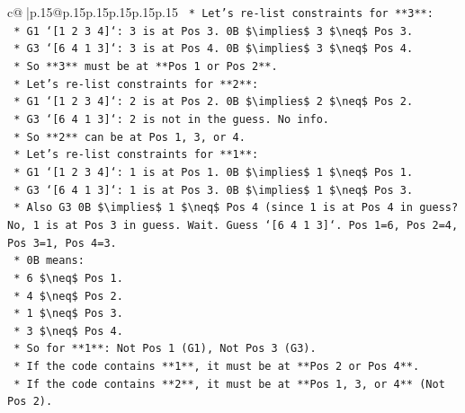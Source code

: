 \documentclass{article}
\begin{document}
{\begin{supertabular}{c@{$\;$}|p{.15\linewidth}@{}p{.15\linewidth}p{.15\linewidth}p{.15\linewidth}p{.15\linewidth}p{.15\linewidth}}
{{{\texttt{            *   Let's re{-}list constraints for **3**:} \\
\texttt{                *   G1 `{[}1 2 3 4{]}`: 3 is at Pos 3. 0B \$\textbackslash{}implies\$ 3 \$\textbackslash{}neq\$ Pos 3.} \\
\texttt{                *   G3 `{[}6 4 1 3{]}`: 3 is at Pos 4. 0B \$\textbackslash{}implies\$ 3 \$\textbackslash{}neq\$ Pos 4.} \\
\texttt{                *   So **3** must be at **Pos 1 or Pos 2**.} \\
\texttt{            *   Let's re{-}list constraints for **2**:} \\
\texttt{                *   G1 `{[}1 2 3 4{]}`: 2 is at Pos 2. 0B \$\textbackslash{}implies\$ 2 \$\textbackslash{}neq\$ Pos 2.} \\
\texttt{                *   G3 `{[}6 4 1 3{]}`: 2 is not in the guess. No info.} \\
\texttt{                *   So **2** can be at Pos 1, 3, or 4.} \\
\texttt{            *   Let's re{-}list constraints for **1**:} \\
\texttt{                *   G1 `{[}1 2 3 4{]}`: 1 is at Pos 1. 0B \$\textbackslash{}implies\$ 1 \$\textbackslash{}neq\$ Pos 1.} \\
\texttt{                *   G3 `{[}6 4 1 3{]}`: 1 is at Pos 3. 0B \$\textbackslash{}implies\$ 1 \$\textbackslash{}neq\$ Pos 3.} \\
\texttt{                *   Also G3 0B \$\textbackslash{}implies\$ 1 \$\textbackslash{}neq\$ Pos 4 (since 1 is at Pos 4 in guess? No, 1 is at Pos 3 in guess. Wait. Guess `{[}6 4 1 3{]}`. Pos 1=6, Pos 2=4, Pos 3=1, Pos 4=3.} \\
\texttt{                *   0B means:} \\
\texttt{                    *   6 \$\textbackslash{}neq\$ Pos 1.} \\
\texttt{                    *   4 \$\textbackslash{}neq\$ Pos 2.} \\
\texttt{                    *   1 \$\textbackslash{}neq\$ Pos 3.} \\
\texttt{                    *   3 \$\textbackslash{}neq\$ Pos 4.} \\
\texttt{                *   So for **1**: Not Pos 1 (G1), Not Pos 3 (G3).} \\
\texttt{                *   If the code contains **1**, it must be at **Pos 2 or Pos 4**.} \\
\texttt{                *   If the code contains **2**, it must be at **Pos 1, 3, or 4** (Not Pos 2).} \\
}}}
\end{supertabular}}
\end{document}
